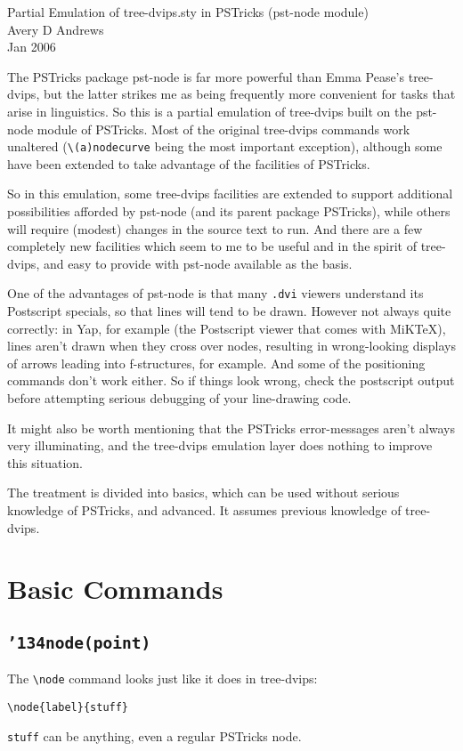 \documentclass[12pt]{article}
\def\pstricks{PSTricks}
\def\bck{\char'134}
\begin{document}
\begin{center}{\large Partial Emulation of {\sf tree-dvips.sty} in {\pstricks}
({\sf pst-node} module)}\\
Avery D Andrews\\
Jan 2006
\end{center}
The {\pstricks} package {\sf pst-node} is far more powerful than Emma Pease's
{\sf tree-dvips}, but the latter strikes me as being frequently more convenient
for tasks that arise in linguistics.  So this is a partial emulation of
{\sf tree-dvips} built on the {\sf pst-node} module of \pstricks.
Most of the original {\sf tree-dvips} commands work unaltered
(\verb&\(a)nodecurve& being the most important exception), although some
have been extended to take advantage of the facilities of \pstricks.

So in this emulation, some {\sf tree-dvips} facilities are extended to support
additional possibilities afforded by {\sf pst-node} (and its parent package
{\pstricks}), while others will require (modest) changes in the source text
to run.  And there are a few completely new facilities which seem to me to
be useful and in the spirit of {\sf tree-dvips}, and easy to provide with
{\sf pst-node} available as the basis.

One of the advantages of {\sf pst-node} is that many {\tt .dvi} viewers
understand its Postscript specials, so that lines will tend to be drawn.
However not always quite correctly: in Yap, for example (the Postscript
viewer that comes with MiKTeX), lines aren't drawn when they cross over nodes,
resulting in wrong-looking displays of arrows leading into f-structures, for
example.  And some of the positioning commands don't work either.
So if things look wrong, check the postscript output before attempting
serious debugging of your line-drawing code.

It might also be worth mentioning that the {\pstricks} error-messages aren't
always very illuminating, and the {\sf tree-dvips} emulation layer does
nothing to improve this situation.

The treatment is divided into basics, which can be used without serious knowledge
of \pstricks, and advanced.  It assumes previous knowledge of {\sf tree-dvips}.

\section{Basic Commands}
\subsection{\tt \bck node(point)}
The \verb&\node& command looks just like it does in {\sf tree-dvips}:
\begin{example}
\begin{verbatim}
\node{label}{stuff}
\end{verbatim}
\end{example}
{\tt stuff} can be anything, even a regular {\pstricks} node.
\end{document}
